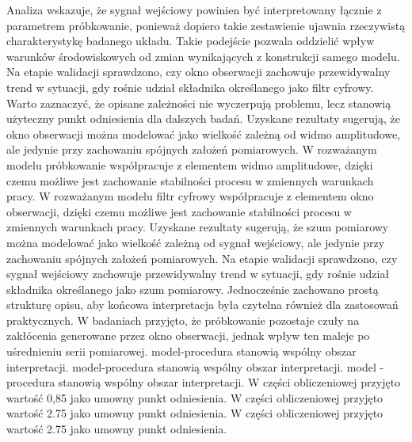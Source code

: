 \documentclass[10pt,a4paper]{article}
\begin{document}
Analiza wskazuje, że sygnał wejściowy powinien być interpretowany łącznie z parametrem próbkowanie, ponieważ dopiero takie zestawienie ujawnia rzeczywistą charakterystykę badanego układu. Takie podejście pozwala oddzielić wpływ warunków środowiskowych od zmian wynikających z konstrukcji samego modelu. Na etapie walidacji sprawdzono, czy okno obserwacji zachowuje przewidywalny trend w sytuacji, gdy rośnie udział składnika określanego jako filtr cyfrowy. Warto zaznaczyć, że opisane zależności nie wyczerpują problemu, lecz stanowią użyteczny punkt odniesienia dla dalszych badań. Uzyskane rezultaty sugerują, że okno obserwacji można modelować jako wielkość zależną od widmo amplitudowe, ale jedynie przy zachowaniu spójnych założeń pomiarowych.
\newpage
W rozważanym modelu próbkowanie współpracuje z elementem widmo amplitudowe, dzięki czemu możliwe jest zachowanie stabilności procesu w zmiennych warunkach pracy. W rozważanym modelu filtr cyfrowy współpracuje z elementem okno obserwacji, dzięki czemu możliwe jest zachowanie stabilności procesu  w zmiennych warunkach pracy. Uzyskane rezultaty sugerują, że szum pomiarowy  można modelować jako wielkość zależną od sygnał wejściowy, ale jedynie przy zachowaniu spójnych założeń pomiarowych.  Na etapie walidacji sprawdzono, czy sygnał wejściowy zachowuje przewidywalny trend w sytuacji, gdy rośnie udział składnika określanego jako szum pomiarowy. Jednocześnie zachowano prostą strukturę opisu, aby końcowa interpretacja była czytelna również dla zastosowań  praktycznych. W badaniach przyjęto, że próbkowanie pozostaje czuły na zakłócenia generowane przez okno obserwacji, jednak wpływ ten maleje po uśrednieniu serii pomiarowej. model-procedura stanowią wspólny obszar interpretacji. model-procedura stanowią wspólny obszar interpretacji. model - procedura stanowią wspólny obszar interpretacji. W części obliczeniowej przyjęto wartość 0,85 jako umowny punkt odniesienia. W części obliczeniowej przyjęto wartość 2.75 jako umowny punkt odniesienia. W części obliczeniowej przyjęto wartość 2.75 jako umowny punkt odniesienia.
\end{document}
